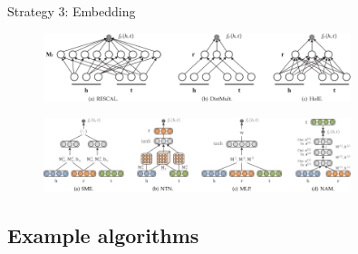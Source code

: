 \documentclass[presentation]{beamer}\mode<presentation>{\usetheme{AMSBolognaFC}}
\begin{document}
\begin{frame}[allowframebreaks]{Strategy 3: Embedding}
    \framebreak
    
    \begin{figure}
        \centering
        \includegraphics[width=0.8\textwidth]{figures/kge-nn-1.png}
    \end{figure}

    \begin{figure}
        \centering
        \includegraphics[width=0.8\textwidth]{figures/kge-nn-2.png}
    \end{figure}
    
\end{frame}

\subsection{Example algorithms}
\end{document}
